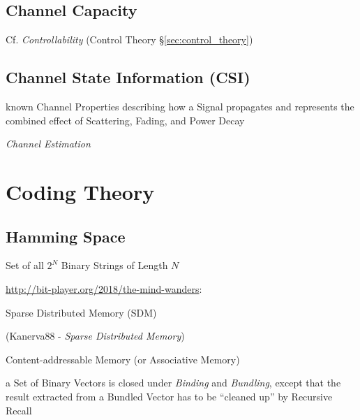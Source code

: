 \subsection{Channel Capacity}\label{sec:channel_capacity}

\fist Cf. \emph{Controllability} (Control Theory
\S\ref{sec:control_theory})



\subsection{Channel State Information (CSI)}\label{sec:csi}

known Channel Properties describing how a Signal propagates and represents the
combined effect of Scattering, Fading, and Power Decay

\emph{Channel Estimation}



\section{Coding Theory}\label{sec:coding_theory}

\subsection{Hamming Space}\label{sec:hamming_space}

Set of all $2^N$ Binary Strings of Length $N$


\url{http://bit-player.org/2018/the-mind-wanders}:

Sparse Distributed Memory (SDM)

(Kanerva88 - \emph{Sparse Distributed Memory})

Content-addressable Memory (or Associative Memory)

a Set of Binary Vectors is closed under \emph{Binding} and \emph{Bundling},
except that the result extracted from a Bundled Vector has to be ``cleaned up''
by Recursive Recall



